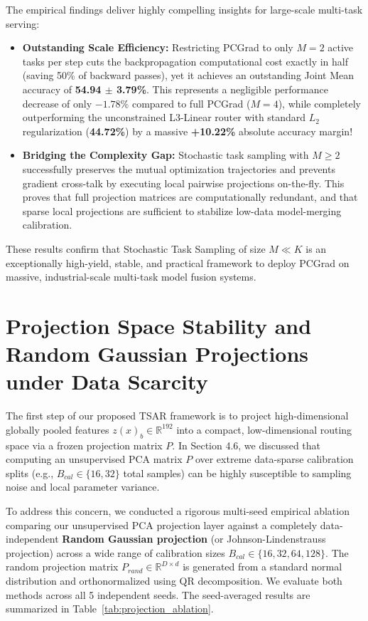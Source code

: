 The empirical findings deliver highly compelling insights for large-scale multi-task serving:
\begin{itemize}
    \item \textbf{Outstanding Scale Efficiency:} Restricting PCGrad to only $M=2$ active tasks per
step cuts the backpropagation computational cost exactly in half (saving 50\% of backward passes),
yet it achieves an outstanding Joint Mean accuracy of \textbf{54.94 $\pm$ 3.79\%}. This represents a
negligible performance decrease of only $-1.78\%$ compared to full PCGrad ($M=4$), while completely
outperforming the unconstrained L3-Linear router with standard $L_2$ regularization
(\textbf{44.72\%}) by a massive \textbf{+10.22\%} absolute accuracy margin!
    \item \textbf{Bridging the Complexity Gap:} Stochastic task sampling with $M \ge 2$
successfully preserves the mutual optimization trajectories and prevents gradient cross-talk by
executing local pairwise projections on-the-fly. This proves that full projection matrices are
computationally redundant, and that sparse local projections are sufficient to stabilize low-data
model-merging calibration.
\end{itemize}
These results confirm that Stochastic Task Sampling of size $M \ll K$ is an exceptionally
high-yield, stable, and practical framework to deploy PCGrad on massive, industrial-scale multi-task
model fusion systems.

\section{Projection Space Stability and Random Gaussian Projections under Data Scarcity}
\label{sec:projection_ablation}

The first step of our proposed TSAR framework is to project high-dimensional globally pooled
features $z(x)_b \in \mathbb{R}^{192}$ into a compact, low-dimensional routing space via a frozen
projection matrix $P$. In Section 4.6, we discussed that computing an unsupervised PCA matrix $P$
over extreme data-sparse calibration splits (e.g., $B_{cal} \in \{16, 32\}$ total samples) can be
highly susceptible to sampling noise and local parameter variance.

To address this concern, we conducted a rigorous multi-seed empirical ablation comparing our
unsupervised PCA projection layer against a completely data-independent \textbf{Random Gaussian
projection} (or Johnson-Lindenstrauss projection) across a wide range of calibration sizes $B_{cal}
\in \{16, 32, 64, 128\}$. The random projection matrix $P_{rand} \in \mathbb{R}^{D \times d}$ is
generated from a standard normal distribution and orthonormalized using QR decomposition. We
evaluate both methods across all 5 independent seeds. The seed-averaged results are summarized in
Table~\ref{tab:projection_ablation}.

